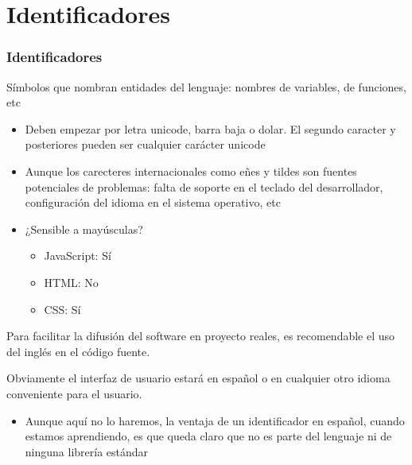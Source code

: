 \documentclass[ucs]{beamer}
\begin{document}
\section{Identificadores}
\begin{frame}[fragile]
\frametitle{Identificadores}
Símbolos que nombran entidades del lenguaje: nombres de variables, de funciones, etc
\begin{itemize}
\item
Deben empezar por letra unicode, barra baja o dolar.
El segundo caracter y posteriores pueden ser cualquier
carácter unicode

\item
Aunque los carecteres internacionales como eñes y tildes
son fuentes potenciales de problemas: falta de soporte en 
el teclado del desarrollador, configuración del idioma en el sistema operativo, etc



\item
¿Sensible a mayúsculas?

\begin{itemize}
\item
JavaScript: Sí

\item
HTML: No

\item
CSS: Sí

\end{itemize}



\end{itemize}

\end{frame}

\begin{frame}[fragile]


Para facilitar la difusión del software
en proyecto reales, es recomendable el uso del inglés 
en el código fuente.

Obviamente el interfaz de usuario estará en español
o en cualquier otro idioma conveniente para el usuario. 

    \begin{itemize}
    \item
Aunque aquí no lo haremos, la ventaja de un identificador en español,
cuando estamos aprendiendo, es que 
queda claro que no es parte del lenguaje ni de ninguna librería estándar
    \end{itemize}


\end{frame}
\end{document}
